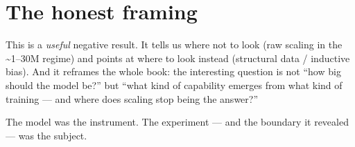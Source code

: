 \section{The honest framing}\label{the-honest-framing}

This is a \emph{useful} negative result. It tells us where not to look
(raw scaling in the \textasciitilde1--30M regime) and points at where to
look instead (structural data / inductive bias). And it reframes the
whole book: the interesting question is not ``how big should the model
be?'' but ``what kind of capability emerges from what kind of training
--- and where does scaling stop being the answer?''

The model was the instrument. The experiment --- and the boundary it
revealed --- was the subject.
